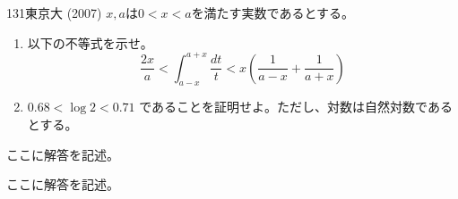 \begin{prob}{131}{}{東京大 (2007)}
 $x, a$は$0<x<a$を満たす実数であるとする。
 \begin{enumerate}
  \item 以下の不等式を示せ。
	\[ \frac{2x}{a} < \int_{a-x}^{a+x}\! \frac{dt}{t} < x\left(\frac{1}{a-x}+\frac{1}{a+x}\right) \]
  \item $0.68 < \log 2 < 0.71$ であることを証明せよ。ただし、対数は自然対数であるとする。
 \end{enumerate}
\end{prob}

ここに解答を記述。

ここに解答を記述。